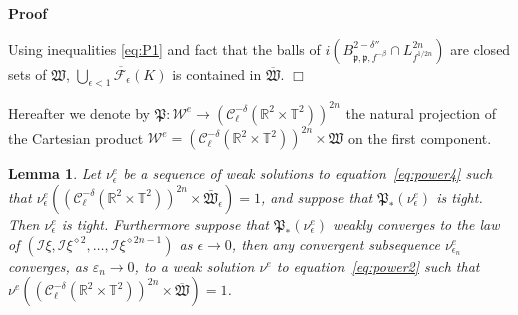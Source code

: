 \documentclass[a4paper,10pt]{article}
\newcommand{\asterisk}{\mathord{*}}
\newenvironment{proof}{\noindent\textbf{Proof\ }}{\hspace*{\fill}$\Box$\medskip}
\newtheorem{lemma}[theorem]{Lemma}
\begin{document}
\begin{proof}
  \
  
  Using inequalities {\eqref{eq:P1}} and fact that the balls of $i (B^{2 -
  \delta''}_{\mathfrak{p}, \mathfrak{p,} f^{- \beta}} \cap L^{2 n}_{f^{1 / 2
  n}})$ are closed sets of $\mathfrak{W}$, $\overline{\bigcup_{\epsilon < 1}
  \mathcal{F}_{\epsilon} (K)}$ is contained in $\overline{\mathfrak{W}}$.
\end{proof}

Hereafter we denote by $\mathfrak{P :} \mathcal{W}^e \rightarrow
(\mathcal{C}^{- \delta}_{\ell} (\mathbb{R}^2 \times \mathbb{T}^2))^{2 n}$ the
natural projection of the Cartesian product $\mathcal{W}^e = (\mathcal{C}^{-
\delta}_{\ell} (\mathbb{R}^2 \times \mathbb{T}^2))^{2 n} \times \mathfrak{W}$
on the first component.

\begin{lemma}
  \label{lemma_tightness}Let $\nu_{\epsilon}^e$ be a sequence of weak
  solutions to equation~{\eqref{eq:power4}} such that $\nu^e_{\epsilon}
  ((\mathcal{C}^{- \delta}_{\ell} (\mathbb{R}^2 \times \mathbb{T}^2))^{2 n}
  \times \mathfrak{\bar{W}}_{\epsilon}) = 1$, and suppose that
  $\mathfrak{P}_{\asterisk} (\nu_{\epsilon}^e)$ is tight. Then
  $\nu_{\epsilon}^e$ is tight. Furthermore suppose that
  $\mathfrak{P}_{\asterisk} (\nu_{\epsilon}^e)$ weakly converges to the law of
  $(\mathcal{I} \xi, \mathcal{I} \xi^{\diamond 2}, \ldots, \mathcal{I}
  \xi^{\diamond 2 n - 1})$ as $\epsilon \rightarrow 0$, then any convergent
  subsequence $\nu_{\epsilon_n}^e$ converges, as $\varepsilon_n \rightarrow
  0$, to a weak solution $\nu^e$ to equation~{\eqref{eq:power2}} such that
  $\nu^e ((\mathcal{C}^{- \delta}_{\ell} (\mathbb{R}^2 \times
  \mathbb{T}^2))^{2 n} \times \overline{\mathfrak{W}}) = 1$.
\end{lemma}
\end{document}
